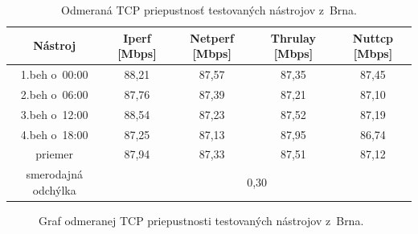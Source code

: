     \begin{table}[h!]
        \begin{center}
            \begin{tabular}{|c|c|c|c|c|}
                \hline
            Nástroj & Iperf [Mbps]& Netperf [Mbps]& Thrulay [Mbps]& Nuttcp [Mbps]\\ 
                \hline
                1.beh o~00:00 & 88,21 & 87,57 & 87,35 & 87,45 \\
                \hline
                2.beh o~06:00 & 87,76 & 87,39 & 87,21 & 87,10 \\
                \hline
                3.beh o~12:00 & 88,54 & 87,23 & 87,52 & 87,19 \\
                \hline
                4.beh o~18:00 & 87,25 & 87,13 & 87,95 & 86,74 \\
                \hline
                priemer & 87,94 & 87,33 & 87,51 & 87,12 \\
                \hline
                smerodajná odchýlka & \multicolumn{4}{c|}{0,30}\\
                \hline
            \end{tabular}
            \caption{Odmeraná TCP priepustnosť testovaných nástrojov z~Brna.} 
            \label{tab_test_tcp}
        \end{center}
    \end{table}
   \begin{figure}[H]
       \begin{center}
               \caption{Graf odmeranej TCP priepustnosti testovaných nástrojov
               z~Brna.}
           \label{tab_test_tcp_graf}
       \end{center}
   \end{figure}

